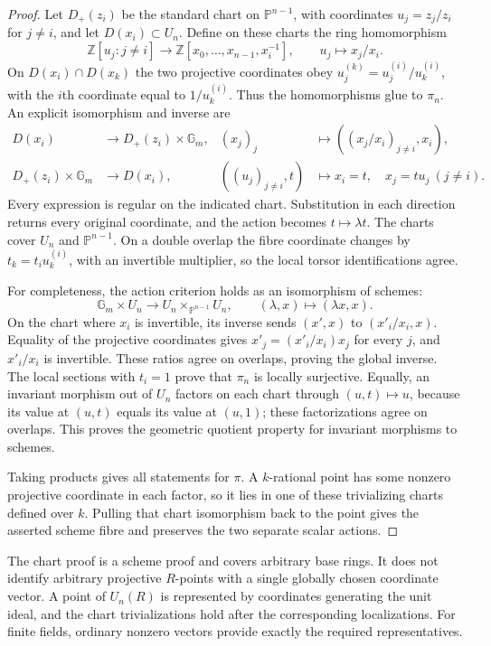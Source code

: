 \begin{proof}
Let $D_+(z_i)$ be the standard chart on $\mathbb P^{n-1}$, with
coordinates $u_j=z_j/z_i$ for $j\ne i$, and let $D(x_i)\subset U_n$.
Define on these charts the ring homomorphism
\[
 \mathbb Z[u_j:j\ne i]\longrightarrow
 \mathbb Z[x_0,\ldots,x_{n-1},x_i^{-1}],\qquad u_j\longmapsto x_j/x_i.
\]
On $D(x_i)\cap D(x_k)$ the two projective coordinates obey
$u^{(k)}_j=u^{(i)}_j/u^{(i)}_k$, with the $i$th coordinate equal to
$1/u^{(i)}_k$. Thus the homomorphisms glue to $\pi_n$.
An explicit isomorphism and inverse are
\begin{align*}
 D(x_i)&\longrightarrow D_+(z_i)\times\mathbb G_m,
 &(x_j)_j&\longmapsto ((x_j/x_i)_{j\ne i},x_i),\\
 D_+(z_i)\times\mathbb G_m&\longrightarrow D(x_i),
 &((u_j)_{j\ne i},t)&\longmapsto x_i=t,\quad x_j=tu_j\ (j\ne i).
\end{align*}
Every expression is regular on the indicated chart. Substitution in each
direction returns every original coordinate, and the action becomes
$t\mapsto\lambda t$. The charts cover $U_n$ and $\mathbb P^{n-1}$.
On a double overlap the fibre coordinate changes by
$t_k=t_i u^{(i)}_k$, with an invertible multiplier, so the local torsor
identifications agree.

For completeness, the action criterion holds as an isomorphism of schemes:
\[
 \mathbb G_m\times U_n\longrightarrow U_n\times_{\mathbb P^{n-1}}U_n,
 \qquad(\lambda,x)\longmapsto(\lambda x,x).
\]
On the chart where $x_i$ is invertible, its inverse sends $(x',x)$
to $(x'_i/x_i,x)$. Equality of the projective coordinates gives
$x'_j=(x'_i/x_i)x_j$ for every $j$, and $x'_i/x_i$ is invertible.
These ratios agree on overlaps, proving the global inverse. The local
sections with $t_i=1$ prove that $\pi_n$ is locally surjective. Equally,
an invariant morphism out of $U_n$ factors on each chart through
$(u,t)\mapsto u$, because its value at $(u,t)$ equals its value at
$(u,1)$; these factorizations agree on overlaps. This proves the
geometric quotient property for invariant morphisms to schemes.

Taking products gives all statements for $\pi$. A $k$-rational point
has some nonzero projective coordinate in each factor, so it lies in
one of these trivializing charts defined over $k$. Pulling that chart
isomorphism back to the point gives the asserted scheme fibre and
preserves the two separate scalar actions.
\end{proof}

\begin{remark}\label{rem:cg-rpoints}
The chart proof is a scheme proof and covers arbitrary base rings. It does
not identify arbitrary projective $R$-points with a single globally chosen
coordinate vector. A point of $U_n(R)$ is represented by coordinates
generating the unit ideal, and the chart trivializations hold after the
corresponding localizations. For finite fields, ordinary nonzero vectors
provide exactly the required representatives.
\end{remark}

